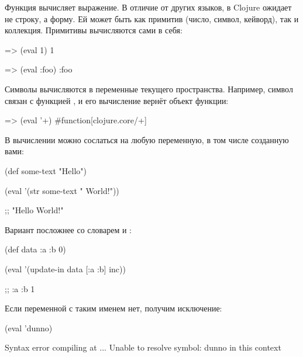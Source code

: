 Функция  вычисляет выражение. В отличие от других языков, в Clojure  ожидает не строку, а форму. Ей может быть как примитив (число, символ, кейворд), так и коллекция. Примитивы вычисляются сами в себя:

\begin{english}
  \begin{clojure}
=> (eval 1)
1

=> (eval :foo)
:foo
  \end{clojure}
\end{english}
Символы вычисляются в переменные текущего пространства. Например, символ \code{+}
связан с функцией , и его вычисление вернёт объект функции:

\begin{english}
  \begin{clojure}
=> (eval '+)
#function[clojure.core/+]
  \end{clojure}
\end{english}

В вычислении можно сослаться на любую переменную, в том числе созданную вами:

\begin{english}
  \begin{clojure}
(def some-text "Hello")

(eval '(str some-text " World!"))

;; "Hello World!"
  \end{clojure}
\end{english}

Вариант посложнее со словарем и :

\begin{english}
  \begin{clojure}
(def data {:a {:b 0}})

(eval '(update-in data [:a :b] inc))

;; {:a {:b 1}}
  \end{clojure}
\end{english}

Если переменной с таким именем нет, получим исключение:

\begin{english}
  \begin{clojure}
(eval 'dunno)

Syntax error compiling at ...
Unable to resolve symbol: dunno in this context
  \end{clojure}
\end{english}


